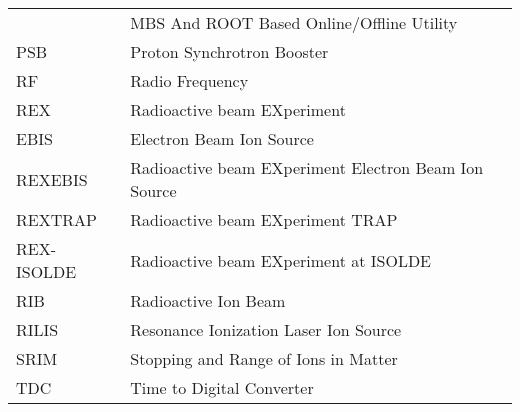 \begin{tabular}{ll}
                &  MBS And ROOT Based Online/Offline Utility                  \\
    PSB         &  Proton Synchrotron Booster                                 \\
    RF          &  Radio Frequency                                            \\
    REX         &  Radioactive beam EXperiment                                \\
    EBIS        &  Electron Beam Ion Source                                   \\
    REXEBIS     &  Radioactive beam EXperiment Electron Beam Ion Source       \\
    REXTRAP     &  Radioactive beam EXperiment TRAP                           \\
    REX-ISOLDE  &  Radioactive beam EXperiment at ISOLDE                      \\
    RIB         &  Radioactive Ion Beam                                       \\
    RILIS       &  Resonance Ionization Laser Ion Source                      \\
    SRIM        &  Stopping and Range of Ions in Matter                       \\
    TDC         &  Time to Digital Converter                                  \\
    \hline
\end{tabular}
\label{tab:acro}
